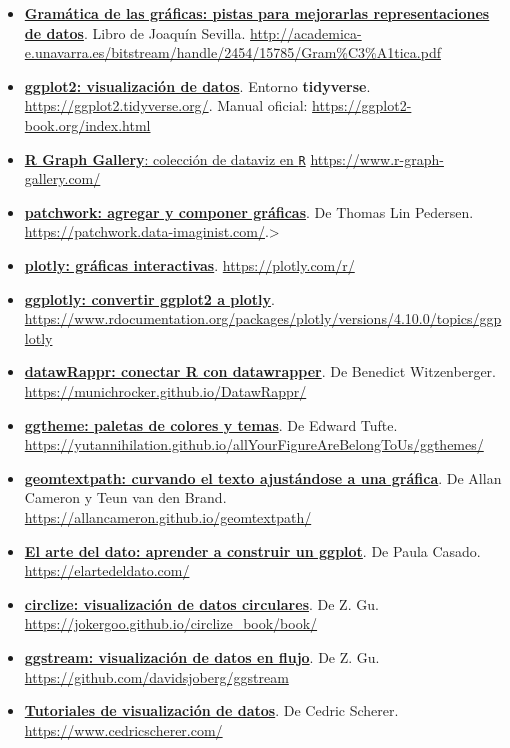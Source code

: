 \documentclass[11pt,]{book}
\begin{document}
\begin{itemize}
\item
  \href{http://academica-e.unavarra.es/bitstream/handle/2454/15785/Gram\%C3\%A1tica.pdf}{\textbf{Gramática de las gráficas: pistas para mejorarlas representaciones de datos}}. Libro de Joaquín Sevilla. \url{http://academica-e.unavarra.es/bitstream/handle/2454/15785/Gram\%C3\%A1tica.pdf}
\item
  \href{https://ggplot2.tidyverse.org/}{\textbf{ggplot2: visualización de datos}}. Entorno \textbf{tidyverse}. \url{https://ggplot2.tidyverse.org/}. Manual oficial: \url{https://ggplot2-book.org/index.html}
\item
  \href{https://www.r-graph-gallery.com/}{\textbf{R Graph Gallery}: colección de dataviz en \texttt{R}} \url{https://www.r-graph-gallery.com/}
\item
  \href{https://patchwork.data-imaginist.com/}{\textbf{patchwork: agregar y componer gráficas}}. De Thomas Lin Pedersen. \url{https://patchwork.data-imaginist.com/}.\textgreater{}
\item
  \href{https://plotly.com/r/}{\textbf{plotly: gráficas interactivas}}. \url{https://plotly.com/r/}
\item
  \href{https://www.rdocumentation.org/packages/plotly/versions/4.10.0/topics/ggplotly}{\textbf{ggplotly: convertir ggplot2 a plotly}}. \url{https://www.rdocumentation.org/packages/plotly/versions/4.10.0/topics/ggplotly}
\item
  \href{https://munichrocker.github.io/DatawRappr/}{\textbf{datawRappr: conectar R con datawrapper}}. De Benedict Witzenberger. \url{https://munichrocker.github.io/DatawRappr/}
\item
  \href{https://yutannihilation.github.io/allYourFigureAreBelongToUs/ggthemes/}{\textbf{ggtheme: paletas de colores y temas}}. De Edward Tufte. \url{https://yutannihilation.github.io/allYourFigureAreBelongToUs/ggthemes/}
\item
  \href{https://allancameron.github.io/geomtextpath/}{\textbf{geomtextpath: curvando el texto ajustándose a una gráfica}}. De Allan Cameron y Teun van den Brand. \url{https://allancameron.github.io/geomtextpath/}
\item
  \href{https://elartedeldato.com/}{\textbf{El arte del dato: aprender a construir un ggplot}}. De Paula Casado. \url{https://elartedeldato.com/}
\item
  \href{https://jokergoo.github.io/circlize_book/book/}{\textbf{circlize: visualización de datos circulares}}. De Z. Gu. \url{https://jokergoo.github.io/circlize_book/book/}
\item
  \href{https://github.com/davidsjoberg/ggstream}{\textbf{ggstream: visualización de datos en flujo}}. De Z. Gu. \url{https://github.com/davidsjoberg/ggstream}
\item
  \href{https://www.cedricscherer.com/}{\textbf{Tutoriales de visualización de datos}}. De Cedric Scherer. \url{https://www.cedricscherer.com/}
\end{itemize}
\end{document}
